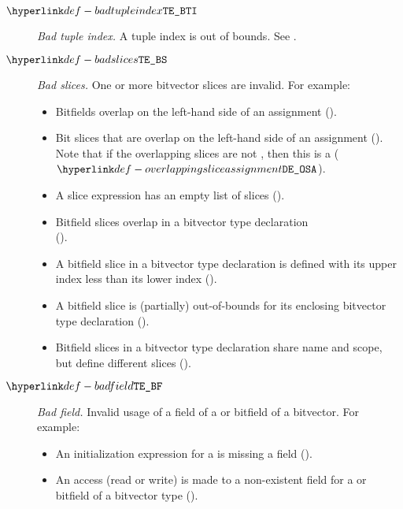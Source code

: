 \begin{description}
\hypertarget{def-badtupleindex}{}
\item[$\BadTupleIndex$]
  \textit{Bad tuple index.}
  A tuple index is out of bounds.
  See .

\hypertarget{def-badslices}{}
\item[$\BadSlices$]
  \textit{Bad slices.}
  One or more bitvector slices are invalid.
  For example:
  \begin{itemize}
    \item Bitfields overlap on the left-hand side of an assignment ().
    \item Bit slices that are \symbolicallyevaluable{} overlap on the left-hand side of an assignment ().
      Note that if the overlapping slices are not \symbolicallyevaluable{}, then this is a \dynamicerrorterm{} ($\OverlappingSliceAssignment$).
    \item A slice expression has an empty list of slices ().
    \item Bitfield slices overlap in a bitvector type declaration \\
      ().
    \item A bitfield slice in a bitvector type declaration is defined with its upper index less than its lower index ().
    \item A bitfield slice is (partially) out-of-bounds for its enclosing bitvector type declaration ().
    \item Bitfield slices in a bitvector type declaration share name and scope, but define different slices ().
  \end{itemize}

\hypertarget{def-badfield}{}
\item[$\BadField$]
  \textit{Bad field.}
  Invalid usage of a field of a \structuredtype{} or bitfield of a bitvector.
  For example:
  \begin{itemize}
    \item An initialization expression for a \structuredtype{} is missing a field ().
    \item An access (read or write) is made to a non-existent field for a \structuredtype{} or bitfield of a bitvector type ().
  \end{itemize}


\end{description}
